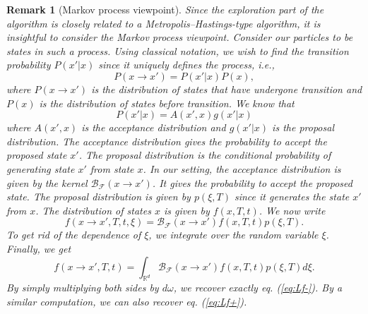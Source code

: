 \documentclass[10pt,a4paper]{article}
\theoremstyle{theorem}
\newtheorem{remark}{Remark}[section]
\numberwithin{equation}{section}
\begin{document}
\begin{remark}[Markov process viewpoint]
Since the exploration part of the algorithm is closely related to a Metropolis--Hastings-type algorithm, it is insightful to consider the Markov process viewpoint. Consider our particles to be states in such a process. Using classical notation, we wish to find the transition probability $P(x'|x)$ since it uniquely defines the process, i.e., 
\begin{equation*}
P(x\rightarrow x')=P(x'|x)P(x),
\end{equation*}
where $P(x\rightarrow x')$ is the distribution of states that have undergone transition and $P(x)$ is the distribution of states before transition. We know that
\begin{equation*}
P(x'|x)=A(x',x)g(x'|x)
\end{equation*} 
where $A(x',x)$ is the acceptance distribution and $g(x'|x)$ is the proposal distribution. The acceptance distribution gives the probability to accept the proposed state $x'$. The proposal distribution is the conditional probability of generating state $x'$ from state $x$. In our setting, the acceptance distribution is given by the kernel $\mathcal{B}_\mathcal{F}(x\rightarrow x')$. It gives the probability to accept the proposed state. The proposal distribution is given by $p(\xi,T)$ since it generates the state $x'$ from $x$. The distribution of states $x$ is given by $f(x,T,t)$. We now write
\begin{equation*}
f(x\rightarrow x',T,t,\xi)=\mathcal{B}_\mathcal{F}(x\rightarrow x')f(x,T,t)p(\xi,T).
\end{equation*}
To get rid of the dependence of $\xi$, we integrate over the random variable $\xi$. Finally, we get
\begin{equation*}
f(x\rightarrow x',T,t)=\int_{\mathbb{R}^d}\mathcal{B}_\mathcal{F}(x\rightarrow x')f(x,T,t)p(\xi,T)d\xi.
\end{equation*}
By simply multiplying both sides by $d\omega$, we recover exactly eq. (\ref{eq:Lf-}). By a similar computation, we can also recover eq. (\ref{eq:Lf+}).
\end{remark}
\end{document}
